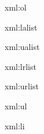 \startxmlsetups xml:ol
    \startitemize[n]
    \stopitemize
\stopxmlsetups

\startxmlsetups xml:lalist
    \startitemize[a]
    \stopitemize
\stopxmlsetups

\startxmlsetups xml:ualist
    \startitemize[A]
    \stopitemize
\stopxmlsetups

\startxmlsetups xml:lrlist
    \startitemize[r]
    \stopitemize
\stopxmlsetups

\startxmlsetups xml:urlist
    \startitemize[R]
    \stopitemize
\stopxmlsetups

\startxmlsetups xml:ul
    \startitemize
    \stopitemize
\stopxmlsetups

\startxmlsetups xml:li
    \startitem
    \stopitem
\stopxmlsetups
